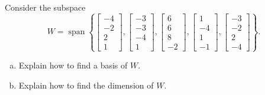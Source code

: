 
\begin{exerciseStatement}


Consider the subspace \[W=\operatorname{span}  \left\{ \left[\begin{array}{c}
-4 \\
-2 \\
2 \\
1
\end{array}\right] , \left[\begin{array}{c}
-3 \\
-3 \\
-4 \\
1
\end{array}\right] , \left[\begin{array}{c}
6 \\
6 \\
8 \\
-2
\end{array}\right] , \left[\begin{array}{c}
1 \\
-4 \\
1 \\
-1
\end{array}\right] , \left[\begin{array}{c}
-3 \\
-2 \\
2 \\
-4
\end{array}\right] \right\} .\]


\begin{enumerate}[(a)]
\item  Explain how to find a basis of \(W\).
\item  Explain how to find the dimension of \(W\).
\end{enumerate}
    
\end{exerciseStatement}
    

